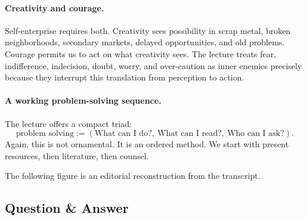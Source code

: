 \paragraph{Creativity and courage.}
Self-enterprise requires both. Creativity sees possibility in scrap metal, broken neighborhoods, secondary markets, delayed opportunities, and old problems. Courage permits us to act on what creativity sees. The lecture treats fear, indifference, indecision, doubt, worry, and over-caution as inner enemies precisely because they interrupt this translation from perception to action.

\paragraph{A working problem-solving sequence.}
The lecture offers a compact triad:
\begin{equation}
\text{problem solving} :=
(\text{What can I do?},\ \text{What can I read?},\ \text{Who can I ask?}).
\end{equation}
Again, this is not ornamental. It is an ordered method. We start with present resources, then literature, then counsel.

The following figure is an editorial reconstruction from the transcript.

\begin{figure}
\centering
{}
\end{figure}

\subsection{Question \& Answer}

